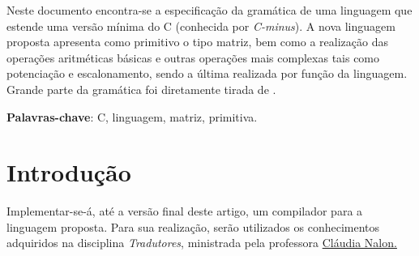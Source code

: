 \documentclass[
	article,			%
	11pt,				%
	oneside,			%
	a4paper,			%
	english,			%
	brazil,				%
	sumario=tradicional
	]{abntex2}
\begin{document}

\frenchspacing 


%
%

\maketitle





\begin{resumoumacoluna}
 Neste documento encontra-se a especificação da gramática de uma linguagem que estende uma versão mínima do C (conhecida por \textit{C-minus}). A nova linguagem proposta apresenta como primitivo o tipo matriz, bem como a realização das operações aritméticas básicas e outras operações mais complexas tais como potenciação e escalonamento, sendo a última realizada por função da linguagem. Grande parte da gramática foi diretamente tirada de \cite{gramatica}.
 \vspace{\onelineskip}
 
 \noindent
 \textbf{Palavras-chave}: C, linguagem, matriz, primitiva.
\end{resumoumacoluna}




\newcommand{\terminal}[1]{ \bnfpn{\textbf{#1}} }

\newcommand{\production}[1]{\bnfpn{\textit{#1}}}
\newcommand{\IT}[1]{\textit{#1}}


\section{Introdução}
Implementar-se-á, até a versão final deste artigo, um compilador para a linguagem proposta. Para sua realização, serão utilizados os conhecimentos adquiridos na disciplina \textit{Tradutores}, ministrada pela professora \hyperref{http://lattes.cnpq.br/7793795625581127}{}{}{Cláudia Nalon.}
\end{document}
